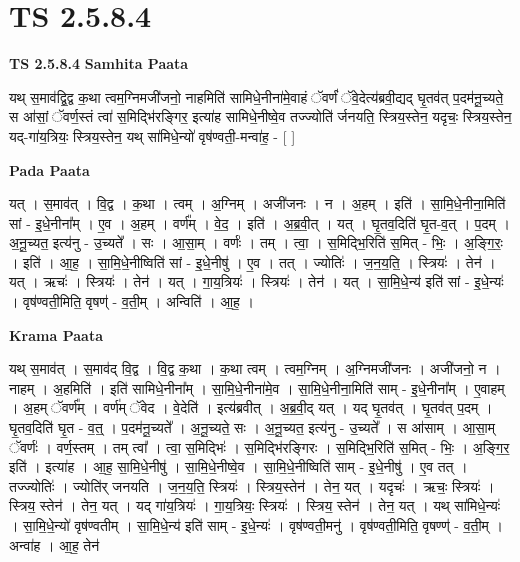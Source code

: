 \documentclass[17pt]{extarticle}
\begin{document}
\section{ TS 2.5.8.4 }

\textbf{TS 2.5.8.4 } \newline
\textbf{Samhita Paata} \newline

यथ् स॒माव॑द्वि॒द्व क॒था त्वम॒ग्निमजी॑जनो॒ नाहमिति॑ सामिधे॒नीना॑मे॒वाहं ॅवर्णं॑ ॅवे॒देत्य॑ब्रवी॒द्यद् घृ॒तव॑त् प॒दम॑नू॒च्यते॒ स आ॑सां॒ ॅवर्ण॒स्तं त्वा॑ स॒मिद्भि॑रङ्गिर॒ इत्या॑ह सामिधे॒नीष्वे॒व तज्ज्योति॑ र्जनयति॒ स्त्रिय॒स्तेन॒ यदृचः॒ स्त्रिय॒स्तेन॒ यद्-गा॑य॒त्रियः॒ स्त्रिय॒स्तेन॒ यथ् सा॑मिधे॒न्यो॑ वृष॑ण्वती॒-मन्वा॑ह॒ - [  ] \newline

\textbf{Pada Paata} \newline

यत् । स॒माव॑त् । वि॒द्व । क॒था । त्वम् । अ॒ग्निम् । अजी॑जनः । न । अ॒हम् । इति॑ । सा॒मि॒धे॒नीना॒मिति॑ सां - इ॒धे॒नीना᳚म् । ए॒व । अ॒हम् । वर्ण᳚म् । वे॒द॒ । इति॑ । अ॒ब्र॒वी॒त् । यत् । घृ॒तव॒दिति॑ घृ॒त-व॒त् । प॒दम् । अ॒नू॒च्यत॒ इत्य॑नु - उ॒च्यते᳚ । सः । आ॒सा॒म् । वर्णः॑ । तम् । त्वा॒ । स॒मिद्भि॒रिति॑ स॒मित् - भिः॒ । अ॒ङ्गि॒रः॒ । इति॑ । आ॒ह॒ । सा॒मि॒धे॒नीष्विति॑ सां - इ॒धे॒नीषु॑ । ए॒व । तत् । ज्योतिः॑ । ज॒न॒य॒ति॒ । स्त्रियः॑ । तेन॑ । यत् । ऋचः॑ । स्त्रियः॑ । तेन॑ । यत् । गा॒य॒त्रियः॑ । स्त्रियः॑ । तेन॑ । यत् । सा॒मि॒धे॒न्य॑ इति॑ सां - इ॒धे॒न्यः॑ । वृष॑ण्वती॒मिति॒ वृषण्॑ - व॒ती॒म् । अन्विति॑ । आ॒ह॒ ।  \newline


\textbf{Krama Paata} \newline

यथ् स॒माव॑त् । स॒माव॑द् वि॒द्व । वि॒द्व क॒था । क॒था त्वम् । त्वम॒ग्निम् । अ॒ग्निमजी॑जनः । अजी॑जनो॒ न । नाहम् । अ॒हमिति॑ । इति॑ सामिधे॒नीना᳚म् । सा॒मि॒धे॒नीना॑मे॒व । सा॒मि॒धे॒नीना॒मिति॑ साम् - इ॒धे॒नीना᳚म् । ए॒वाहम् । अ॒हम् ॅवर्ण᳚म् । वर्ण॑म् ॅवेद । वे॒देति॑ । इत्य॑ब्रवीत् । अ॒ब्र॒वी॒द् यत् । यद् घृ॒तव॑त् । घृ॒तव॑त् प॒दम् । घृ॒तव॒दिति॑ घृ॒त - व॒त्॒ । प॒दम॑नू॒च्यते᳚ । अ॒नू॒च्यते॒ सः । अ॒नू॒च्यत॒ इत्य॑नु - उ॒च्यते᳚ । स आ॑साम् । आ॒सा॒म् ॅवर्णः॑ । वर्ण॒स्तम् । तम् त्वा᳚ । त्वा॒ स॒मिद्भिः॑ । स॒मिद्भि॑रङ्गिरः । स॒मिद्भि॒रिति॑ स॒मित् - भिः॒ । अ॒ङ्गि॒र॒ इति॑ । इत्या॑ह । आ॒ह॒ सा॒मि॒धे॒नीषु॑ । सा॒मि॒धे॒नीष्वे॒व । सा॒मि॒धे॒नीष्विति॑ साम् - इ॒धे॒नीषु॑ । ए॒व तत् । तज्ज्योतिः॑ । ज्योति॑र् जनयति । ज॒न॒य॒ति॒ स्त्रियः॑ । स्त्रिय॒स्तेन॑ । तेन॒ यत् । यदृचः॑ । ऋचः॒ स्त्रियः॑ । स्त्रिय॒ स्तेन॑ । तेन॒ यत् । यद् गा॑य॒त्रियः॑ । गा॒य॒त्रियः॒ स्त्रियः॑ । स्त्रिय॒ स्तेन॑ । तेन॒ यत् । यथ् सा॑मिधे॒न्यः॑ । सा॒मि॒धे॒न्यो॑ वृष॑ण्वतीम् । सा॒मि॒धे॒न्य॑ इति॑ साम् - इ॒धे॒न्यः॑ । वृष॑ण्वती॒मनु॑ । वृष॑ण्वती॒मिति॒ वृषण्ण्॑ - व॒ती॒म् । अन्वा॑ह । आ॒ह॒ तेन॑ \newline
\end{document}
